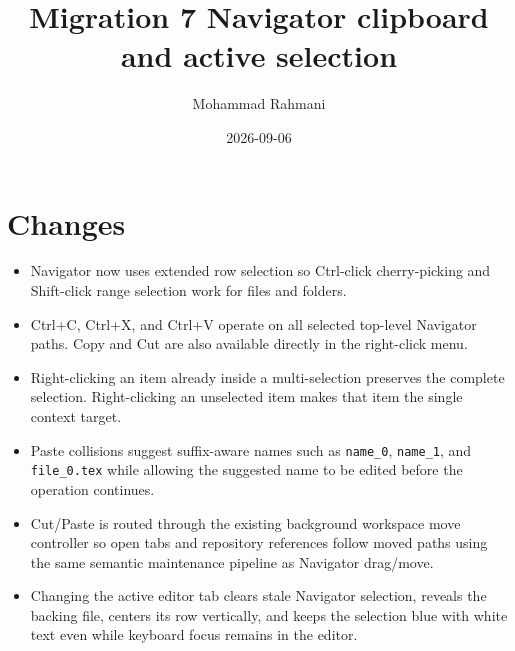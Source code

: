 \documentclass[a4paper]{article}
\title{Migration 7 Navigator clipboard and active selection}
\date{2026-09-06}
\author{Mohammad Rahmani}
\begin{document}
   \maketitle

   \section{Changes}
   \begin{itemize}
      \item Navigator now uses extended row selection so Ctrl-click cherry-picking and Shift-click range selection work for files and folders.
      \item Ctrl+C, Ctrl+X, and Ctrl+V operate on all selected top-level Navigator paths. Copy and Cut are also available directly in the right-click menu.
      \item Right-clicking an item already inside a multi-selection preserves the complete selection. Right-clicking an unselected item makes that item the single context target.
      \item Paste collisions suggest suffix-aware names such as \texttt{name\_0}, \texttt{name\_1}, and \texttt{file\_0.tex} while allowing the suggested name to be edited before the operation continues.
      \item Cut/Paste is routed through the existing background workspace move controller so open tabs and repository references follow moved paths using the same semantic maintenance pipeline as Navigator drag/move.
      \item Changing the active editor tab clears stale Navigator selection, reveals the backing file, centers its row vertically, and keeps the selection blue with white text even while keyboard focus remains in the editor.
   \end{itemize}

   
   
\end{document}
